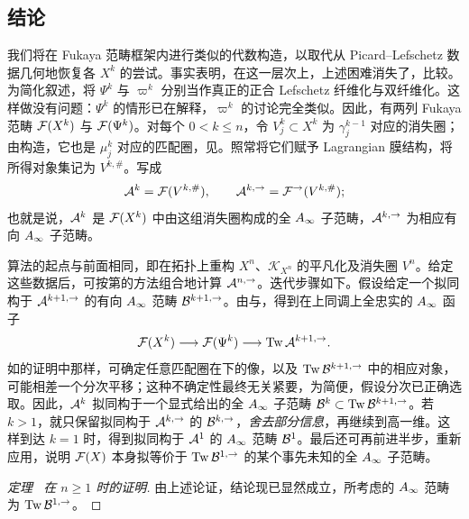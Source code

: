\subsection{结论}\label{sec:19d}
我们将在 Fukaya 范畴框架内进行类似的代数构造，以取代从 Picard--Lefschetz 数据几何地恢复各 $X^k$ 的尝试。事实表明，在这一层次上，上述困难消失了，比较。为简化叙述，将 $\Psi^k$ 与 $\varpi^k$ 分别当作真正的正合 Lefschetz 纤维化与双纤维化。这样做没有问题：$\Psi^k$ 的情形已在解释，$\varpi^k$ 的讨论完全类似。因此，有两列 Fukaya 范畴 $\mathcal F(X^k)$ 与 $\mathcal F(\Psi^k)$。对每个 $0<k\le n$，令 $V_j^k\subset X^k$ 为 $\gamma_j^{k-1}$ 对应的消失圈；由构造，它也是 $\mu_j^k$ 对应的匹配圈，见。照常将它们赋予 Lagrangian 膜结构，将所得对象集记为 $V^{k,\#}$。写成
\[
\mathcal A^k=\mathcal F(V^{k,\#}),\qquad
\mathcal A^{k,\to}=\mathcal F^\to(V^{k,\#});
\]
也就是说，$\mathcal A^k$ 是 $\mathcal F(X^k)$ 中由这组消失圈构成的全 $A_\infty$ 子范畴，$\mathcal A^{k,\to}$ 为相应有向 $A_\infty$ 子范畴。

算法的起点与前面相同，即在拓扑上重构 $X^n$、$\mathcal K_{X^n}$ 的平凡化及消失圈 $V^n$。给定这些数据后，可按第的方法组合地计算 $\mathcal A^{n,\to}$。迭代步骤如下。假设给定一个拟同构于 $\mathcal A^{k+1,\to}$ 的有向 $A_\infty$ 范畴 $\mathcal B^{k+1,\to}$。由与，得到在上同调上全忠实的 $A_\infty$ 函子
\begin{equation}\label{eq:19.6}
\mathcal F(X^k)\longrightarrow\mathcal F(\Psi^k)\longrightarrow\operatorname{Tw}\mathcal A^{k+1,\to}.
\end{equation}
如的证明中那样，可确定任意匹配圈在下的像，以及 $\operatorname{Tw}\mathcal B^{k+1,\to}$ 中的相应对象，可能相差一个分次平移；这种不确定性最终无关紧要，为简便，假设分次已正确选取。因此，$\mathcal A^k$ 拟同构于一个显式给出的全 $A_\infty$ 子范畴 $\mathcal B^k\subset\operatorname{Tw}\mathcal B^{k+1,\to}$。若 $k>1$，就只保留拟同构于 $\mathcal A^{k,\to}$ 的 $\mathcal B^{k,\to}$，\emph{舍去部分信息}，再继续到高一维。这样到达 $k=1$ 时，得到拟同构于 $\mathcal A^1$ 的 $A_\infty$ 范畴 $\mathcal B^1$。最后还可再前进半步，重新应用，说明 $\mathcal F(X)$ 本身拟等价于 $\operatorname{Tw}\mathcal B^{1,\to}$ 的某个事先未知的全 $A_\infty$ 子范畴。

\begin{proof}[定理~ 在 $n\ge1$ 时的证明]
由上述论证，结论现已显然成立，所考虑的 $A_\infty$ 范畴为 $\operatorname{Tw}\mathcal B^{1,\to}$。
\end{proof}

